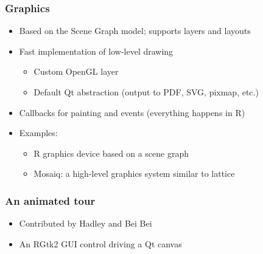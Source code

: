 \documentclass[compress]{beamer}
\begin{document}
\begin{frame}
  \frametitle{Graphics}
  \begin{itemize}
  \item Based on the Scene Graph model; supports layers and layouts
  \item Fast implementation of low-level drawing
    \begin{itemize}
    \item Custom OpenGL layer
    \item Default Qt abstraction (output to PDF, SVG, pixmap, etc.)
    \end{itemize}
  \item Callbacks for painting and events (everything happens in R)
  \item Examples:
    \begin{itemize}
    \item R graphics device based on a scene graph
    \item Mosaiq: a high-level graphics system similar to lattice
    \end{itemize}
  \end{itemize}
\end{frame}




\begin{frame}
  \frametitle{An animated tour}
  \begin{itemize}
  \item Contributed by Hadley and Bei Bei 
  \item An RGtk2 GUI control driving a Qt canvas  
  \end{itemize}
\end{frame}
\end{document}
